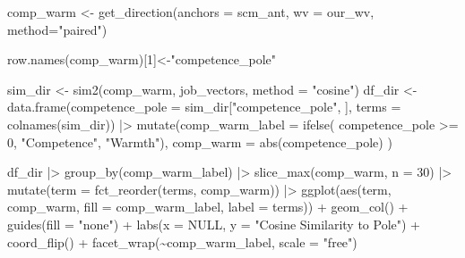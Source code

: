 \documentclass[
  letterpaper,
  DIV=11,
  numbers=noendperiod]{scrreprt}
\newenvironment{Shaded}{\begin{snugshade}}{\end{snugshade}}
\newcommand{\AttributeTok}[1]{\textcolor[rgb]{0.40,0.45,0.13}{#1}}
\newcommand{\ConstantTok}[1]{\textcolor[rgb]{0.56,0.35,0.01}{#1}}
\newcommand{\DecValTok}[1]{\textcolor[rgb]{0.68,0.00,0.00}{#1}}
\newcommand{\FunctionTok}[1]{\textcolor[rgb]{0.28,0.35,0.67}{#1}}
\newcommand{\NormalTok}[1]{\textcolor[rgb]{0.00,0.23,0.31}{#1}}
\newcommand{\OtherTok}[1]{\textcolor[rgb]{0.00,0.23,0.31}{#1}}
\newcommand{\SpecialCharTok}[1]{\textcolor[rgb]{0.37,0.37,0.37}{#1}}
\newcommand{\StringTok}[1]{\textcolor[rgb]{0.13,0.47,0.30}{#1}}
\begin{document}
\begin{Shaded}
\begin{Highlighting}[]
\NormalTok{comp\_warm }\OtherTok{\textless{}{-}} \FunctionTok{get\_direction}\NormalTok{(}\AttributeTok{anchors =}\NormalTok{ scm\_ant, }\AttributeTok{wv =}\NormalTok{ our\_wv, }\AttributeTok{method=}\StringTok{"paired"}\NormalTok{)}

\FunctionTok{row.names}\NormalTok{(comp\_warm)[}\DecValTok{1}\NormalTok{]}\OtherTok{\textless{}{-}}\StringTok{"competence\_pole"}

\NormalTok{sim\_dir }\OtherTok{\textless{}{-}} \FunctionTok{sim2}\NormalTok{(comp\_warm, job\_vectors, }\AttributeTok{method =} \StringTok{"cosine"}\NormalTok{)}
\NormalTok{df\_dir }\OtherTok{\textless{}{-}} \FunctionTok{data.frame}\NormalTok{(}\AttributeTok{competence\_pole =}\NormalTok{ sim\_dir[}\StringTok{"competence\_pole"}\NormalTok{, ],}
                     \AttributeTok{terms =} \FunctionTok{colnames}\NormalTok{(sim\_dir)) }\SpecialCharTok{|\textgreater{}}
  \FunctionTok{mutate}\NormalTok{(}\AttributeTok{comp\_warm\_label =} \FunctionTok{ifelse}\NormalTok{(}
\NormalTok{    competence\_pole }\SpecialCharTok{\textgreater{}=} \DecValTok{0}\NormalTok{,}
    \StringTok{"Competence"}\NormalTok{, }\StringTok{"Warmth"}\NormalTok{),}
    \AttributeTok{comp\_warm =} \FunctionTok{abs}\NormalTok{(competence\_pole)}
\NormalTok{  )}

\NormalTok{df\_dir }\SpecialCharTok{|\textgreater{}}
  \FunctionTok{group\_by}\NormalTok{(comp\_warm\_label) }\SpecialCharTok{|\textgreater{}}
  \FunctionTok{slice\_max}\NormalTok{(comp\_warm, }\AttributeTok{n =} \DecValTok{30}\NormalTok{) }\SpecialCharTok{|\textgreater{}}
  \FunctionTok{mutate}\NormalTok{(}\AttributeTok{term =} \FunctionTok{fct\_reorder}\NormalTok{(terms, comp\_warm)) }\SpecialCharTok{|\textgreater{}}
  \FunctionTok{ggplot}\NormalTok{(}\FunctionTok{aes}\NormalTok{(term, comp\_warm, }\AttributeTok{fill =}\NormalTok{ comp\_warm\_label, }\AttributeTok{label =}\NormalTok{ terms)) }\SpecialCharTok{+}
  \FunctionTok{geom\_col}\NormalTok{() }\SpecialCharTok{+}
  \FunctionTok{guides}\NormalTok{(}\AttributeTok{fill =} \StringTok{"none"}\NormalTok{) }\SpecialCharTok{+}
  \FunctionTok{labs}\NormalTok{(}\AttributeTok{x =} \ConstantTok{NULL}\NormalTok{, }\AttributeTok{y =} \StringTok{"Cosine Similarity to Pole"}\NormalTok{) }\SpecialCharTok{+}
  \FunctionTok{coord\_flip}\NormalTok{() }\SpecialCharTok{+}
  \FunctionTok{facet\_wrap}\NormalTok{(}\SpecialCharTok{\textasciitilde{}}\NormalTok{comp\_warm\_label, }\AttributeTok{scale =} \StringTok{"free"}\NormalTok{)}
\end{Highlighting}
\end{Shaded}
\end{document}
